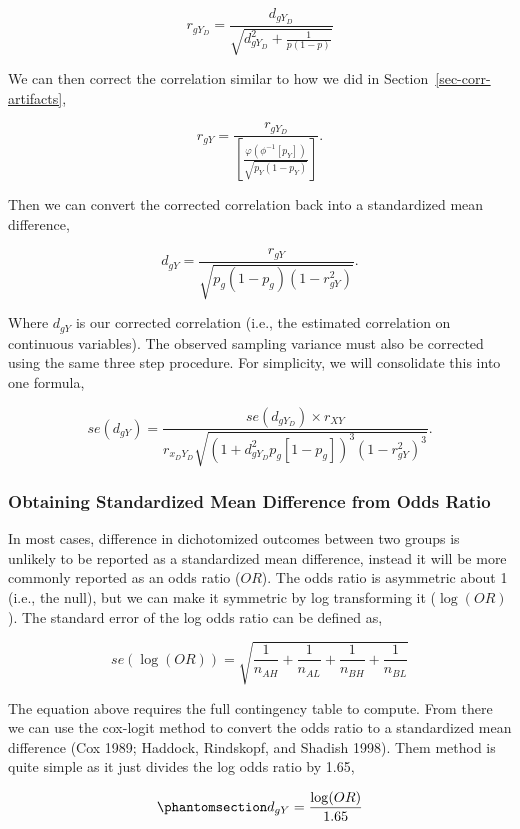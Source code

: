 \documentclass[
  letterpaper,
  DIV=11,
  numbers=noendperiod]{scrreprt}
\begin{document}
\[
r_{gY_D} = \frac{d_{gY_D}}{\sqrt{d_{gY_D}^2+\frac{1}{p(1-p)}}}
\]

We can then correct the correlation similar to how we did in
Section~\ref{sec-corr-artifacts},

\[
r_{gY} = \frac{r_{gY_D}}{\left[\frac{\varphi\left(\phi^{-1}[p_Y]\right)}{\sqrt{p_Y(1-p_Y)}}\right]}.
\]

Then we can convert the corrected correlation back into a standardized
mean difference,

\[
d_{gY} = \frac{r_{gY}}{\sqrt{p_g\left(1-p_g\right)\left(1-r_{gY}^2\right)}}.
\]

Where \(d_{gY}\) is our corrected correlation (i.e., the estimated
correlation on continuous variables). The observed sampling variance
must also be corrected using the same three step procedure. For
simplicity, we will consolidate this into one formula,

\[
se(d_{gY}) = \frac {se(d_{gY_D}) \times r_{XY}} {r_{x_DY_D}\sqrt{\left(1+d_{gY_D}^2p_g[1-p_g]\right)^3(1-r_{gY}^2)^3}}.
\]

\subsubsection*{Obtaining Standardized Mean Difference from Odds
Ratio}\label{obtaining-standardized-mean-difference-from-odds-ratio}

In most cases, difference in dichotomized outcomes between two groups is
unlikely to be reported as a standardized mean difference, instead it
will be more commonly reported as an odds ratio (\(OR\)). The odds ratio
is asymmetric about 1 (i.e., the null), but we can make it symmetric by
log transforming it (\(\log(OR)\)). The standard error of the log odds
ratio can be defined as,

\[
se(\log(OR)) = \sqrt{\frac{1}{n_{AH}} + \frac{1}{n_{AL}} + \frac{1}{n_{BH}} + \frac{1}{n_{BL}}}
\]

The equation above requires the full contingency table to compute. From
there we can use the cox-logit method to convert the odds ratio to a
standardized mean difference (Cox 1989; Haddock, Rindskopf, and Shadish
1998). Them method is quite simple as it just divides the log odds ratio
by 1.65,

\begin{equation}\phantomsection\label{eq-or-d}{
d_{gY} = \frac{\log(OR)}{1.65}
}\end{equation}
\end{document}
